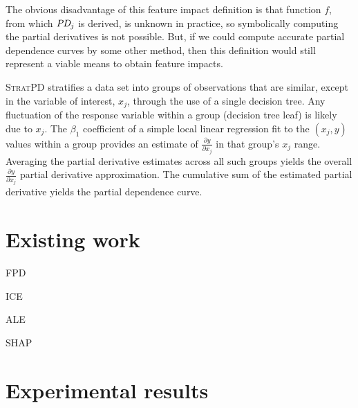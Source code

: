 \documentclass{article}
\newcommand{\spd}{\fontfamily{cmr}\textsc{\small StratPD}}
\begin{document}
The obvious disadvantage of this feature impact definition is that function $f$, from which $\text{\it PD}_j$ is derived, is unknown in practice, so symbolically computing the partial derivatives is not possible. But, if we could compute accurate partial dependence curves by some other method, then this definition would still represent a viable means to obtain feature impacts. 

\spd{} stratifies a data set into groups of observations that are similar, except in the variable of interest, $x_j$, through the use of a single decision tree. Any fluctuation of the response variable within a group (decision tree leaf) is likely due to $x_j$.  The $\beta_1$ coefficient of a simple local linear regression fit to the $(x_j, y)$ values within a group provides an estimate of $\frac{\partial y}{\partial x_j}$ in that group's $x_j$ range. Averaging the partial derivative estimates across all such groups yields the overall $\frac{\partial y}{\partial x_j}$ partial derivative approximation. The cumulative sum of the estimated partial derivative yields the partial dependence curve. 

\section{Existing work}

FPD

ICE

ALE

SHAP

\section{Experimental results}
\end{document}
